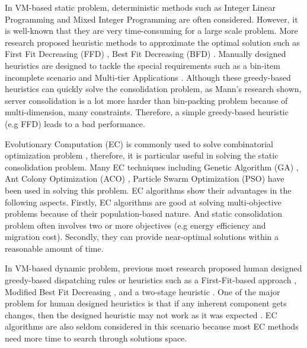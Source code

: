 In VM-based static problem, deterministic methods such as  
Integer Linear Programming \cite{Speitkamp:2010ck} and Mixed
Integer Programming \cite{Wang:2016eh} are often considered. However, it is well-known that they are very time-consuming for a large scale problem. More research proposed heuristic methods
 to approximate the optimal solution such as 
First Fit Decreasing (FFD) \cite{Panigrahy:2011wk}, Best Fit Decreasing (BFD) \cite{Beloglazov:2012ji}.
Manually designed heuristics are designed to tackle the special requirements such 
as a bin-item incomplete scenario \cite{Gupta:2008ul} and Multi-tier Applications \cite{Jung:2008vb, Li:2009wf}. Although these greedy-based heuristics can quickly solve the consolidation problem,  as Mann's research \cite{Mann:2015ua} shown, server consolidation is a lot more harder than bin-packing problem because of multi-dimension, many constraints. Therefore, a simple greedy-based heuristic (e.g FFD) leads to a bad performance. 

Evolutionary Computation (EC) is commonly used to solve combinatorial optimization problem \cite{Guzek:2015ds}, therefore, it is particular useful in solving the static consolidation problem.  Many EC techniques including Genetic Algorithm (GA) \cite{Xu:2010vh}, Ant Colony Optimization (ACO) \cite{Gao:2013gg, Mateos:2013bm}, Particle Swarm Optimization (PSO) \cite{Jeyarani:2012fg} have been used in solving this problem. EC algorithms show their advantages in the following aspects. Firstly, EC algorithms are good at solving multi-objective problems because of their population-based nature. And static consolidation problem often involves two or more objectives (e.g energy efficiency and migration cost). Secondly,  they can provide near-optimal solutions within a reasonable amount of time.  

In VM-based dynamic problem, 
previous most research proposed human designed greedy-based dispatching rules or heuristics such as a First-Fit-based approach \cite{Bobroff:2007ec}, Modified Best Fit Decreasing \cite{Beloglazov:2012ji}, and a two-stage heuristic \cite{Zhang:2015jm}. One of the major problem for human designed heuristics is that if any inherent component gets changes, then the designed heuristic may not work as it was expected \cite{SoteloFigueroa:2013be}. EC algorithms are also seldom considered in this scenario because most EC methods need more time to search through solutions space.

